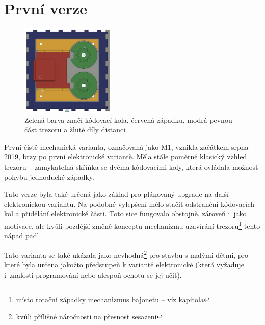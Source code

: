 \section{První verze}
\label{M1-vyvoj}

\begin{figure}
    \centering
    \includegraphics[width=0.4\textwidth]{kapitoly/obrazky/M1/mechanizmus.png}
    \caption{Zelená barva značí kódovací kola, červená západku, modrá pevnou část trezoru a žluté díly distanci \centering}
    \label{fig:M1-mechanizmus}
\end{figure}
První čistě mechanická varianta, označovaná jako M1, vznikla začátkem srpna 2019, brzy po první  elektronické variantě.
Měla stále poměrně klasický vzhled trezoru -- zamykatelná skříňka se dvěma  kódovacími koly, která ovládala možnost pohybu jednoduché západky.

Tato verze byla také určená jako základ pro plánovaný upgrade na další elektronickou
variantu. Na podobné vylepšení mělo stačit odstranění kódo\-va\-cích kol a přidělání elektronické části. Toto sice fungovalo obstojně, zároveň 
i~jako motivace, ale kvůli pozdější změně konceptu mechanizmu uzavírání trezoru\footnote{místo rotační západky mechanizmus bajonetu -- viz kapitola %
} tento nápad padl.

Tato varianta se také ukázala jako nevhodná\footnote{kvůli přílišné náročnosti na přesnost sesazení} pro stavbu s malými dětmi, 
pro které byla určena jakožto předstupeň k variantě elektronické (která vyžaduje i~znalosti programování nebo alespoň ochotu se jej  učit).

\newpage